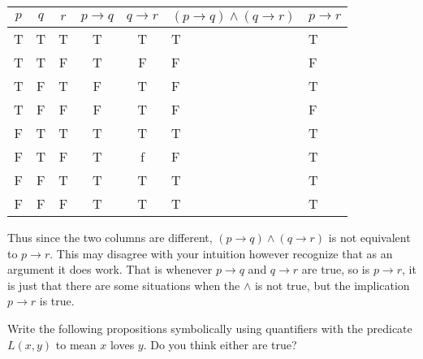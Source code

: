 \documentclass[addpoints]{exam}
\begin{document}
\begin{questions}
\begin{parts}
\begin{solution}
      \begin{tabular}[h]{c | c | c | c | c | a | a}
        $p$ & $q$ & $r$ & $p\rightarrow q$ & $q\rightarrow r$ & $(p\rightarrow
        q) \wedge (q \rightarrow r)$ & $p\rightarrow r$\\
        \hline
        T & T & T & T & T & T & T\\
        T & T & F & T & F & F & F\\
        T & F & T & F & T & F & T\\
        T & F & F & F & T & F & F\\
        F & T & T & T & T & T & T\\
        F & T & F & T & f & F & T\\
        F & F & T & T & T & T & T\\
        F & F & F & T & T & T & T
      \end{tabular}

      Thus since the two columns are different, $(p\rightarrow q) \wedge 
      (q\rightarrow r)$ is not equivalent to $p\rightarrow r$. This may disagree
      with your intuition however recognize that as an argument it does work.
      That is whenever $p\rightarrow q$ and $q\rightarrow r$ are true, so is
      $p\rightarrow r$, it is just that there are some situations when the
      $\wedge$ is not true, but the implication $p\rightarrow r$ is true. 
    \end{solution}

  \end{parts}

  \question[6] Write the following propositions symbolically using quantifiers
  with the predicate $L(x,y)$ to mean $x$ loves $y$. Do you think either are
  true?
\end{questions}
\end{document}

